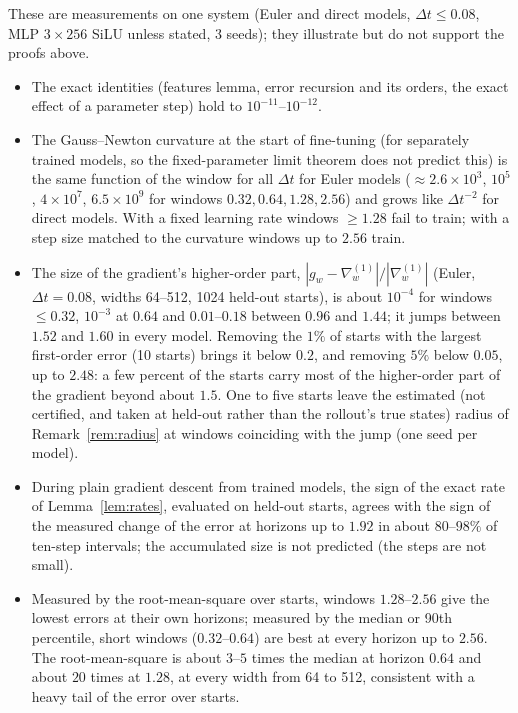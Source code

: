 \documentclass[11pt]{article}
\theoremstyle{definition}
\theoremstyle{remark}
\newcommand{\dt}{\Delta t}
\begin{document}
These are measurements on one system (Euler and direct models, $\dt\le0.08$, MLP $3\times256$ SiLU unless stated, 3 seeds); they illustrate but do not support the proofs above.
\begin{itemize}
\item The exact identities (features lemma, error recursion and its orders, the exact effect of a parameter step) hold to $10^{-11}$--$10^{-12}$.
\item The Gauss--Newton curvature at the start of fine-tuning (for separately trained models, so the fixed-parameter limit theorem does not predict this) is the same function of the window for all $\dt$ for Euler models ($\approx2.6\times10^3$, $10^5$, $4\times10^7$, $6.5\times10^9$ for windows $0.32,0.64,1.28,2.56$) and grows like $\dt^{-2}$ for direct models. With a fixed learning rate windows $\ge1.28$ fail to train; with a step size matched to the curvature windows up to $2.56$ train.
\item The size of the gradient's higher-order part, $|g_w-\nabla^{(1)}_w|/|\nabla^{(1)}_w|$ (Euler, $\dt=0.08$, widths 64--512, 1024 held-out starts), is about $10^{-4}$ for windows $\le0.32$, $10^{-3}$ at $0.64$ and $0.01$--$0.18$ between $0.96$ and $1.44$; it jumps between $1.52$ and $1.60$ in every model.
Removing the $1\%$ of starts with the largest first-order error (10 starts) brings it below $0.2$, and removing $5\%$ below $0.05$, up to $2.48$: a few percent of the starts carry most of the higher-order part of the gradient beyond about $1.5$.
One to five starts leave the estimated (not certified, and taken at held-out rather than the rollout's true states) radius of Remark~\ref{rem:radius} at windows coinciding with the jump (one seed per model).
\item During plain gradient descent from trained models, the sign of the exact rate of Lemma~\ref{lem:rates}, evaluated on held-out starts, agrees with the sign of the measured change of the error at horizons up to $1.92$ in about $80$--$98\%$ of ten-step intervals; the accumulated size is not predicted (the steps are not small).
\item Measured by the root-mean-square over starts, windows $1.28$--$2.56$ give the lowest errors at their own horizons; measured by the median or 90th percentile, short windows ($0.32$--$0.64$) are best at every horizon up to $2.56$. The root-mean-square is about $3$--$5$ times the median at horizon $0.64$ and about $20$ times at $1.28$, at every width from 64 to 512, consistent with a heavy tail of the error over starts.
\end{itemize}
\end{document}
